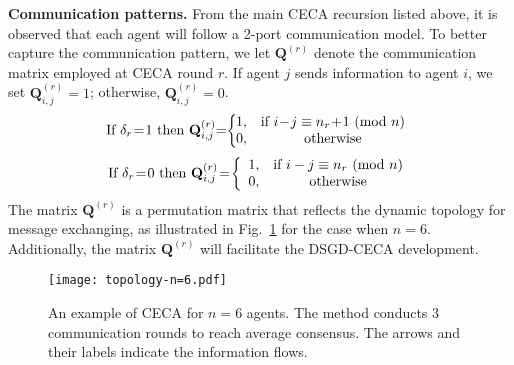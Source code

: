 \documentclass{article}
\newcommand{\vQ}{\mathbf{Q}}
\newcommand{\ro}{{(r)}}
\newcommand{\Mod}[1]{\ (\mathrm{mod}\ #1)}
\theoremstyle{plain}
\theoremstyle{definition}
\begin{document}
\textbf{Communication patterns.} From the main CECA recursion listed above, it is observed that each agent will follow a 2-port communication model. To better capture the communication pattern, we let $\vQ^\ro$ denote the communication matrix employed at CECA round $r$. If agent $j$ sends information to agent $i$, {we set} $\vQ^\ro_{i,j}=1$; otherwise, $\vQ^\ro_{i,j}=0$.
\begin{equation}
\label{eq:2p-gossip-matrix-d1}
\mbox{If $\delta_r\hspace{-0.7mm}=\hspace{-0.7mm}1$ then }\vQ^\ro_{i,j}\hspace{-1mm}=\hspace{-1mm}
\left\{
\begin{array}{cc}
    \hspace{-2mm}1, & \textup{if $i\hspace{-0.6mm}-\hspace{-0.6mm}j\equiv n_r\hspace{-0.6mm}+\hspace{-0.6mm}1 \Mod{n}$} \\
    \hspace{-2mm}0, & \textup{otherwise}
\end{array}
\right.
\end{equation}
\begin{equation}
\label{eq:2p-gossip-matrix-d0}
\mbox{If $\delta_r\hspace{-0.7mm}=\hspace{-0.7mm}0$ then }\vQ^\ro_{i,j}\hspace{-0.7mm}=\hspace{-0.7mm}
\left\{
\begin{array}{cc}
    1, & \textup{if $i-j\equiv n_r \Mod{n}$} \\
    0, & \textup{otherwise}
\end{array}
\right.
\end{equation}
The matrix $\vQ^\ro$ is a permutation matrix that reflects the dynamic topology for message exchanging, as illustrated in Fig.~\ref{fig:2p-example-n=6-2} for the case when $n=6$. Additionally, the matrix $\vQ^\ro$ will facilitate the DSGD-CECA development. 


\begin{figure}[t]
\vskip 0.2in
\begin{center}
\centerline{\texttt{[image: topology-n=6.pdf]}}
\vspace{-0.2mm}
\caption{
An example of CECA for $n=6$ agents. 
The method conducts 3 communication rounds to reach average consensus. 
The arrows and their labels indicate  the information flows.}
\label{fig:2p-example-n=6-2}
\end{center}
\vskip -0.4in
\end{figure}
\end{document}
